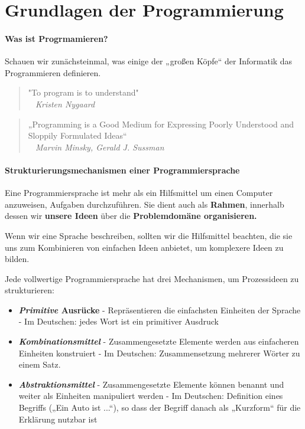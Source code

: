 
\chapter{Grundlagen der Programmierung}
\label{c:grundlagen}
\setcounter{page}{1}
\subsubsection{Was ist Progrmamieren?}

Schauen wir zunächsteinmal, was einige der „großen Köpfe“ der
Informatik das Programmieren definieren.

\begin{quote}
	"To program is to understand" \\
	\textit{~ Kristen Nygaard}
\end{quote}

\begin{quote}
	„Programming is a Good Medium for Expressing Poorly
	Understood and Sloppily Formulated Ideas“\\
	\textit{~ Marvin Minsky, Gerald J. Sussman}
\end{quote}

\subsubsection{Strukturierungsmechanismen einer
Programmiersprache}

Eine Programmiersprache ist mehr als ein Hilfsmittel um einen
Computer anzuweisen, Aufgaben durchzuführen.
Sie dient auch als \textbf{Rahmen}, innerhalb dessen wir \textbf{unsere
Ideen} über die \textbf{Problemdomäne organisieren.}

Wenn wir eine Sprache beschreiben, sollten wir
die Hilfsmittel beachten, die sie uns zum
Kombinieren von einfachen Ideen anbietet, um
komplexere Ideen zu bilden.

Jede vollwertige Programmiersprache hat drei Mechanismen,
um Prozessideen zu strukturieren:

\begin{itemize}
	\item \textbf{\textit{Primitive} Ausrücke}
		\subitem - Repräsentieren die einfachsten Einheiten der Sprache
		\subitem - Im Deutschen: jedes Wort ist ein primitiver Ausdruck
	\item \textbf{\textit{Kombinationsmittel}}
		\subitem - Zusammengesetzte Elemente werden aus einfacheren Einheiten
		konstruiert
		\subitem - Im Deutschen: Zusammensetzung mehrerer Wörter zu einem Satz.
	\item \textbf{\textit{Abstraktionsmittel}}
		\subitem - Zusammengesetzte Elemente können benannt und weiter als Einheiten manipuliert werden
		\subitem - Im Deutschen: Definition eines Begriffs („Ein Auto ist ...“), so dass der Begriff danach als „Kurzform“ für die Erklärung nutzbar ist
\end{itemize}

